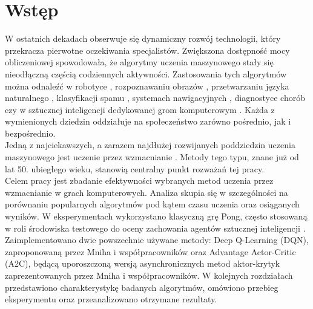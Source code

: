 \documentclass[a4paper, 12pt]{article}
\numberwithin{equation}{section}
\begin{document}
    \section{Wstęp}
    W ostatnich dekadach obserwuje się dynamiczny rozwój technologii, który przekracza pierwotne oczekiwania specjalistów.
    Zwiększona dostępność mocy obliczeniowej spowodowała, że algorytmy uczenia maszynowego \cite{HandsOnMachineLearning} stały się nieodłączną częścią codziennych aktywności.
    Zastosowania tych algorytmów można odnaleźć w robotyce \cite{kober2013reinforcement}, rozpoznawaniu obrazów \cite{krizhevsky2012imagenet}, przetwarzaniu języka naturalnego \cite{vaswani2017attention}, klasyfikacji spamu \cite{sahami1998bayesian}, systemach nawigacyjnych \cite{huang2019lstm}, diagnostyce chorób \cite{esteva2017dermatologist} czy w sztucznej inteligencji dedykowanej grom komputerowym \cite{silver2016mastering}. 
    Każda z wymienionych dziedzin oddziałuje na społeczeństwo zarówno pośrednio, jak i bezpośrednio.
    \\
    \indent Jedną z najciekawszych, a zarazem najdłużej rozwijanych poddziedzin uczenia maszynowego jest uczenie przez wzmacnianie \cite{sutton2018rl}. 
    Metody tego typu, znane już od lat 50. ubiegłego wieku, stanowią centralny punkt rozważań tej pracy.
    \\
    \indent Celem pracy jest zbadanie efektywności wybranych metod uczenia przez wzmacnianie w grach komputerowych. 
    Analiza skupia się w szczególności na porównaniu popularnych algorytmów pod kątem czasu uczenia oraz osiąganych wyników.
    W eksperymentach wykorzystano klasyczną grę Pong, często stosowaną w roli środowiska testowego do oceny zachowania agentów sztucznej inteligencji \cite{russell2010artificial}. 
    Zaimplementowano dwie powszechnie używane metody: Deep Q-Learning (DQN), zaproponowaną przez Mniha i współpracowników \cite{mnih2015dqn} oraz Advantage Actor-Critic (A2C),
    będącą uporoszczoną wersją asynchronicznych metod aktor-krytyk zaprezentowanych przez Mniha i współpracowników. \cite{mnih2016a3c} 
    W kolejnych rozdziałach przedstawiono charakterystykę badanych algorytmów, omówiono przebieg eksperymentu oraz przeanalizowano otrzymane rezultaty.
\end{document}
